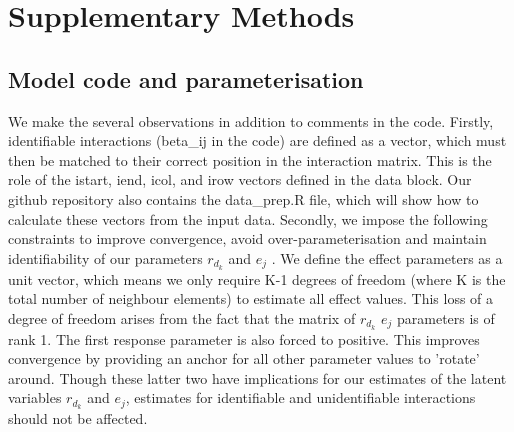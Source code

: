 \documentclass[a4,12pt]{article}
\begin{document}


\newpage 

\section{Supplementary Methods}

\setcounter{figure}{0}

\label{SI:Methods}

    \subsection{Model code and parameterisation}
    \label{SI:modelcode}
    

    We make the several observations in addition to comments in the code. Firstly, identifiable interactions (beta\_ij in the code) are defined as a vector, which must then be matched to their correct position in the interaction matrix. This is the role of the istart, iend, icol, and irow vectors defined in the data block. Our github repository also contains the data\_prep.R file, which will show how to calculate these vectors from the input data. 
    Secondly, we impose the following constraints to improve convergence, avoid over-parameterisation and maintain identifiability of our parameters $r_{d_k}$ and $e_j$ \parencite{Huber2004, Kidzinski2020, Niku2021}. We define the effect parameters as a unit vector, which means we only require K-1 degrees of freedom (where K is the total number of neighbour elements) to estimate all effect values. This loss of a degree of freedom arises from the fact that the matrix of $r_{d_k}$ $e_j$ parameters is of rank 1. The first response parameter is also forced to positive. This improves convergence by providing an anchor for all other parameter values to 'rotate' around. Though these latter two have implications for our estimates of the latent variables $r_{d_k}$ and $e_j$, estimates for identifiable and unidentifiable interactions should not be affected.
\end{document}
